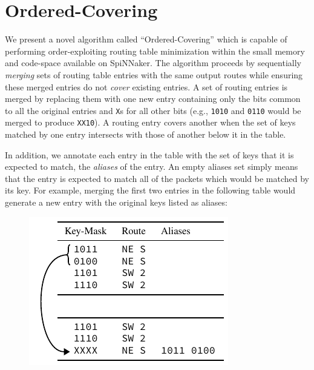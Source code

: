 \documentclass[conference]{IEEEtran}
\newcommand{\mytt}[1]{\texttt{\footnotesize#1}}
\begin{document}
\section{Ordered-Covering}

  We present a novel algorithm called ``Ordered-Covering'' which is capable of performing order-exploiting routing table minimization within the small memory and code-space available on SpiNNaker.
  The algorithm proceeds by sequentially \textit{merging} sets of routing table entries with the same output routes while ensuring these merged entries do not \textit{cover} existing entries. 
  A set of routing entries is merged by replacing them with one new entry containing only the bits common to all the original entries and \mytt{X}s for all other bits
  (e.g., \mytt{1010} and \mytt{0110} would be merged to produce \mytt{XX10}).
  A routing entry covers another when the set of keys matched by one entry intersects with those of another below it in the table.

  In addition, we annotate each entry in the table with the set of keys that it is expected to match, the \textit{aliases} of the entry.
  An empty aliases set simply means that the entry is expected to match all of the packets which would be matched by its key.
  For example, merging the first two entries in the following table would generate a new entry with the original keys listed as aliases:

  \begin{figure}[H]
    \centering
    \includegraphics{figures/aliases_example}
  \end{figure}
\end{document}
